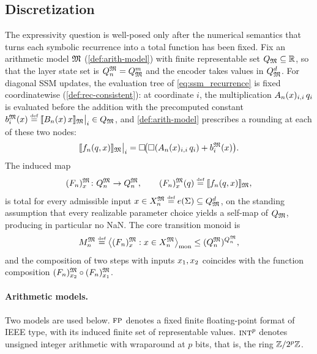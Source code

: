 \documentclass{article}
\begin{document}
\subsection{Discretization}\label{sec:ssm-discretization}

The expressivity question is well-posed only after the numerical semantics that turns each symbolic recurrence into a total function has been fixed.
Fix an arithmetic model $\mathfrak{M}$ (\cref{def:arith-model}) with finite representable set $Q_{\mathfrak{M}} \subseteq \mathbb{R}$, so that the layer state set is $Q_n^{\mathfrak{M}} = Q_{\mathfrak{M}}^{m}$ and the encoder takes values in $Q_{\mathfrak{M}}^d$.
For diagonal SSM updates, the evaluation tree of \cref{eq:ssm_recurrence} is fixed coordinatewise (\cref{def:rec-consistent}): at coordinate $i$, the multiplication $A_n(x)_{i,i}\,q_i$ is evaluated before the addition with the precomputed constant $b_i^{\mathfrak{M}}(x) \mathrel{\stackrel{\textnormal{\tiny def}}{=}} \llbracket B_n(x)\,x \rrbracket_{\mathfrak{M}}\big|_i \in Q_{\mathfrak{M}}$, and \cref{def:arith-model} prescribes a rounding at each of these two nodes:
$$
\llbracket f_n(q, x) \rrbracket_{\mathfrak{M}} \big|_i = \square\!\bigl( \square( A_n(x)_{i,i}\, q_i ) + b_i^{\mathfrak{M}}(x) \bigr).
$$
The induced map
$$
(F_n)_x^{\mathfrak{M}} \colon Q_n^{\mathfrak{M}} \to Q_n^{\mathfrak{M}}, \qquad
(F_n)_x^{\mathfrak{M}}(q) \mathrel{\stackrel{\textnormal{\tiny def}}{=}} \llbracket f_n(q, x) \rrbracket_{\mathfrak{M}},
$$
is total for every admissible input $x \in X_n^{\mathfrak{M}} \mathrel{\stackrel{\textnormal{\tiny def}}{=}} e(\Sigma) \subseteq Q_{\mathfrak{M}}^d$, on the standing assumption that every realizable parameter choice yields a self-map of $Q_{\mathfrak{M}}$, producing in particular no NaN.
The core transition monoid is
$$
M_n^{\mathfrak{M}} \mathrel{\stackrel{\textnormal{\tiny def}}{=}} \bigl\langle (F_n)_x^{\mathfrak{M}} : x \in X_n^{\mathfrak{M}} \bigr\rangle_{\mathrm{mon}} \leq (Q_n^{\mathfrak{M}})^{Q_n^{\mathfrak{M}}},
$$
and the composition of two steps with inputs $x_1, x_2$ coincides with the function composition $(F_n)_{x_2}^{\mathfrak{M}} \circ (F_n)_{x_1}^{\mathfrak{M}}$.

\paragraph{Arithmetic models.}
Two models are used below.
$\textsc{fp}$ denotes a fixed finite floating-point format of IEEE type, with its induced finite set of representable values.
$\textsc{int}^p$ denotes unsigned integer arithmetic with wraparound at $p$ bits, that is, the ring $\mathbb{Z}/2^p\mathbb{Z}$.
\end{document}
